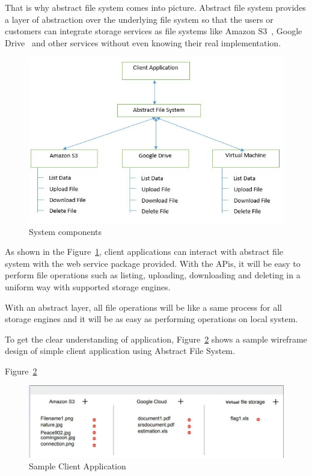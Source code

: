 That is why abstract file system comes into picture. Abstract file system
provides a layer of abstraction over the underlying file system so that the
users or customers can integrate storage services as file systems like 
Amazon S3~\cite{hid-sp18-420-amazon-S3}, 
Google Drive~\cite{hid-sp18-420-google-drive} and other services 
without even knowing their real implementation.



\begin{figure}[!ht]
        \centering\includegraphics[width=\columnwidth]
        {image/architecture.JPG}
        \caption{System components}\label{fig:architecture}
\end{figure}


As shown in the Figure~\ref{fig:architecture}, 
client applications can interact with abstract file 
system with the web service package provided. With the APis, it will be easy 
to perform file operations such as listing, uploading, downloading and 
deleting in a uniform way with supported storage engines. 

With an abstract layer, all file operations will be like a same process for 
all storage engines and it will be as easy as performing operations on local 
system. 


To get the clear understanding of application, Figure~\ref{fig:client} 
shows a sample wireframe 
design of simple client application using Abstract File System. 

Figure~\ref{fig:client}
\begin{figure}[!ht]
        \centering\includegraphics[width=\columnwidth]
        {image/client.JPG}
        \caption{Sample Client Application}\label{fig:client}
\end{figure}




